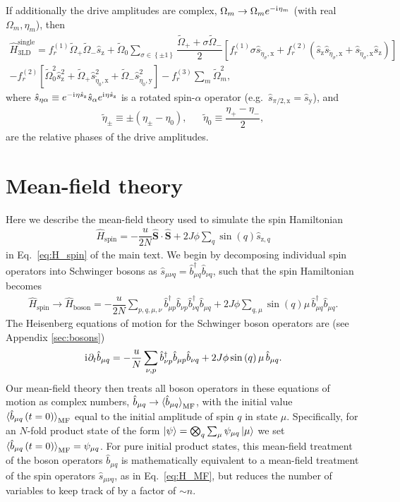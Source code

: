 \documentclass[aps,pra,nofootinbib,twocolumn,superscriptaddress]{revtex4-2}
\renewcommand{\t}{\text} %
\newcommand{\f}[2]{\dfrac{#1}{#2}} %
\newcommand{\p}[1]{\left(#1\right)} %
\renewcommand{\sp}[1]{\left[#1\right]} %
\renewcommand{\set}[1]{\left\{#1\right\}} %
\newcommand{\bk}{\braket} %
\renewcommand{\v}{\bm} %
\renewcommand{\i}{\mathrm{i}\mkern1mu} %
\newcommand{\1}{\mathds{1}}
\renewcommand{\b}{\hat b}
\newcommand{\s}{\hat s}
\renewcommand{\H}{\hat H}
\renewcommand{\S}{\hat S}
\newcommand{\x}{\text{x}}
\newcommand{\y}{\text{y}}
\newcommand{\z}{\text{z}}
\newcommand{\spin}{\text{spin}}
\newcommand{\MF}{\text{MF}}
\begin{document}
If additionally the drive amplitudes are complex, $\Omega_m\to\Omega_me^{-\i\eta_m}$ (with real $\Omega_m,\eta_m$), then
\begin{multline}
  \H_{\t{3LD}}^{\t{single}}
  = f_r^{(1)} \tilde\Omega_+ \tilde\Omega_- \s_\z
  + \tilde\Omega_0 \sum_{\sigma\in\set{\pm1}}
  \f{\tilde\Omega_+ + \sigma\tilde\Omega_-}{2}
  \sp{f_r^{(1)} \sigma \s_{\tilde\eta_\sigma,\x}
    + f_r^{(2)} \p{\s_\z \s_{\tilde\eta_\sigma,\x}
      + \s_{\tilde\eta_\sigma,\x} \s_\z}} \\
  - f_r^{(2)} \sp{\tilde\Omega_0^2 \s_\z^2
    + \tilde\Omega_+ \s_{\tilde\eta_0,\x}^2
    + \tilde\Omega_- \s_{\tilde\eta_0,\y}^2}
  - f_r^{(3)} \sum_m \tilde\Omega_m^2,
\end{multline}
where $\s_{\eta\alpha} \equiv e^{-\i\eta \s_\z} \s_\alpha e^{\i\eta \s_\z}$ is a rotated spin-$\alpha$ operator (e.g.~$\s_{\pi/2,\x}=\s_\y$), and
\begin{align}
  \tilde\eta_\pm \equiv \pm \p{\eta_\pm - \eta_0},
  &&
  \tilde\eta_0 \equiv \f{\eta_+ - \eta_-}{2},
\end{align}
are the relative phases of the drive amplitudes.

\section{Mean-field theory}
\label{sec:MFT}

Here we describe the mean-field theory used to simulate the spin Hamiltonian
\begin{align}
  \H_\spin = -\f{u}{2N}\v\S\cdot\v\S + 2J\phi \sum_q \sin\p{q} \s_{\z,q}
\end{align}
in Eq.~\eqref{eq:H_spin} of the main text.
We begin by decomposing individual spin operators into Schwinger bosons as $\s_{\mu\nu q} = \b_{\mu q}^\dag \b_{\nu q}$, such that the spin Hamiltonian becomes
\begin{align}
  \H_\spin \to \H_{\t{boson}}
  = -\f{u}{2N} \sum_{p,q,\mu,\nu}
  \b_{\mu p}^\dag \b_{\nu p} \b_{\nu q}^\dag \b_{\mu q}
  + 2J\phi \sum_{q,\mu} \sin\p{q} \mu\, \b_{\mu q}^\dag \b_{\mu q}.
\end{align}
The Heisenberg equations of motion for the Schwinger boson operators are (see Appendix \ref{sec:bosons})
\begin{align}
  \i \partial_t \b_{\mu q}
  = -\f{u}{N} \sum_{\nu,p} \b_{\nu p}^\dag \b_{\mu p} \b_{\nu q}
  + 2J\phi \sin\p{q} \mu\, \b_{\mu q}.
\end{align}
Our mean-field theory then treats all boson operators in these equations of motion as complex numbers, $\b_{\mu q}\to\bk{\b_{\mu q}}_\MF$, with the initial value $\bk{\b_{\mu q}\p{t=0}}_\MF$ equal to the initial amplitude of spin $q$ in state $\mu$.
Specifically, for an $N$-fold product state of the form $\ket\psi=\bigotimes_q\sum_\mu\psi_{\mu q}\ket{\mu}$ we set $\bk{\b_{\mu q}\p{t=0}}_\MF = \psi_{\mu q}$.
For pure initial product states, this mean-field treatment of the boson operators $\b_{\mu q}$ is mathematically equivalent to a mean-field treatment of the spin operators $\s_{\mu\nu q}$, as in Eq.~\eqref{eq:H_MF}, but reduces the number of variables to keep track of by a factor of $\sim n$.
\end{document}

